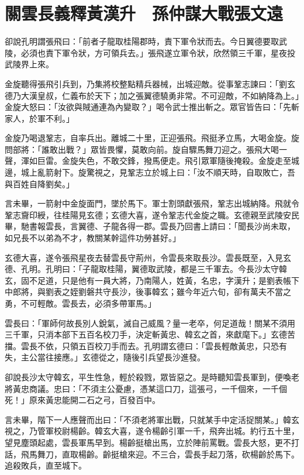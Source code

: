 
\chapter{關雲長義釋黃漢升　孫仲謀大戰張文遠}

卻說孔明謂張飛曰：「前者子龍取桂陽郡時，責下軍令狀而去。今日翼德要取武陵，必須也責下軍令狀，方可領兵去。」張飛遂立軍令狀，欣然領三千軍，星夜投武陵界上來。

金旋聽得張飛引兵到，乃集將校整點精兵器械，出城迎敵。從事鞏志諫曰：「劉玄德乃大漢皇叔，仁義布於天下；加之張翼德驍勇非常。不可迎敵，不如納降為上。」金旋大怒曰：「汝欲與賊通連為內變取？」喝令武士推出斬之。眾官皆告曰：「先斬家人，於軍不利。」

金旋乃喝退鞏志，自率兵出。離城二十里，正迎張飛。飛挺矛立馬，大喝金旋。旋問部將：「誰敢出戰？」眾皆畏懼，莫敢向前。旋自驟馬舞刀迎之。張飛大喝一聲，渾如巨雷。金旋失色，不敢交鋒，撥馬便走。飛引眾軍隨後掩殺。金旋走至城邊，城上亂箭射下。旋驚視之，見鞏志立於城上曰：「汝不順天時，自取敗亡，吾與百姓自降劉矣。」

言未畢，一箭射中金旋面門，墜於馬下。軍士割頭獻張飛，鞏志出城納降。飛就令鞏志齎印綬，往桂陽見玄德；玄德大喜，遂令鞏志代金旋之職。玄德親至武陵安民畢，馳書報雲長，言翼德、子龍各得一郡。雲長乃回書上請曰：「聞長沙尚未取，如兄長不以弟為不才，教關某幹這件功勞甚好。」

玄德大喜，遂令張飛星夜去替雲長守荊州，令雲長來取長沙。雲長既至，入見玄德、孔明。孔明曰：「子龍取桂陽，翼德取武陵，都是三千軍去。今長沙太守韓玄，固不足道，只是他有一員大將，乃南陽人，姓黃，名忠，字漢升；是劉表帳下中郎將，與劉表之姪劉磐共守長沙，後事韓玄；雖今年近六旬，卻有萬夫不當之勇，不可輕敵。雲長去，必須多帶軍馬。」

雲長曰：「軍師何故長別人銳氣，滅自己威風？量一老卒，何足道哉！關某不須用三千軍，只消本部下五百名校刀手，決定斬黃忠、韓玄之首，來獻麾下。」玄德苦擋。雲長不依，只領五百校刀手而去。孔明謂玄德曰：「雲長輕敵黃忠，只恐有失，主公當往接應。」玄德從之，隨後引兵望長沙進發。

卻說長沙太守韓玄，平生性急，輕於殺戮，眾皆惡之。是時聽知雲長軍到，便喚老將黃忠商議。忠曰：「不須主公憂慮，憑某這口刀，這張弓，一千個來，一千個死！」原來黃忠能開二石之弓，百發百中。

言未畢，階下一人應聲而出曰：「不須老將軍出戰，只就某手中定活捉關某。」韓玄視之，乃管軍校尉楊齡。韓玄大喜，遂令楊齡引軍一千，飛奔出城。約行五十里，望見塵頭起處，雲長軍馬早到。楊齡挺槍出馬，立於陣前罵戰。雲長大怒，更不打話，飛馬舞刀，直取楊齡。齡挺槍來迎。不三合，雲長手起刀落，砍楊齡於馬下。追殺敗兵，直至城下。

